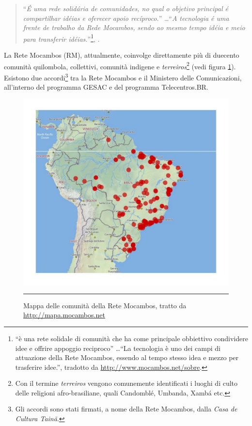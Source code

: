 \begin{quote}
  ``\emph{É uma rede solidária de comunidades, no qual o objetivo
    principal é compartilhar idéias e oferecer apoio recíproco.}''
  \ldots ``\emph{A tecnologia é uma frente de trabalho da Rede
    Mocambos, sendo ao mesmo tempo idéia e meio para transferir
    idéias.}''\footnote{``è una rete solidale di comunità che ha come
    principale obbiettivo condividere idee e offrire appoggio
    reciproco'' \ldots ``La tecnologia è uno dei campi di attuazione
    della Rete Mocambos, essendo al tempo stesso idea e mezzo per
    trasferire idee.'', tradotto da
    \url{http://www.mocambos.net/sobre}.}, \citep{RMSobre}.
\end{quote}

La Rete Mocambos (RM), attualmente, coinvolge direttamente più di
duecento comunità quilombola, collettivi, comunità indigene e
\emph{terreiros}\footnote{Con il termine \emph{terreiros} vengono
  comunemente identificati i luoghi di culto delle religioni
  afro-brasiliane, quali Candomblé, Umbanda, Xambá etc.} (vedi figura
\ref{fig:MappaRedeMocambos}). Esistono due accordi\footnote{Gli
  accordi sono stati firmati, a nome della Rete Mocambos, dalla
  \emph{Casa de Cultura Tainã}.} tra la Rete Mocambos e il Ministero
delle Comunicazioni, all'interno del programma GESAC e del programma
Telecentros.BR.

\begin{figure}[htbp]
  \centering
  \includegraphics[width=\textwidth]{./Figure/MappaRedeMocambos.pdf}
  \rule{35em}{0.5pt}
  \caption[Mappa delle comunità della Rete Mocambos, tratto da
  \url{http://mapa.mocambos.net}]{Mappa delle comunità della Rete
    Mocambos, tratto da \url{http://mapa.mocambos.net}}
  \label{fig:MappaRedeMocambos}
\end{figure}

